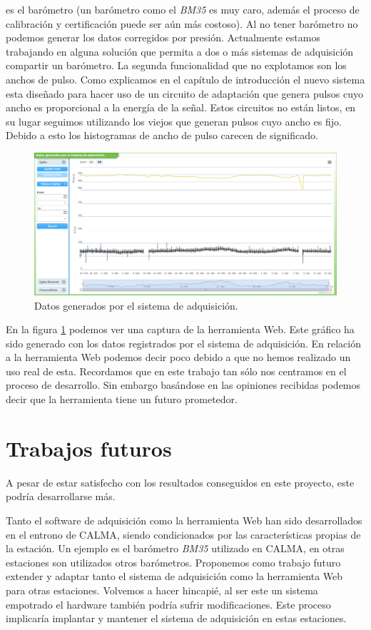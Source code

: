 	es el barómetro (un barómetro como el \emph{BM35} es muy caro, además el proceso de calibración y certificación puede ser aún más costoso). Al no
	tener barómetro no podemos generar los datos corregidos por presión. Actualmente estamos trabajando en alguna solución que permita a dos o más
	sistemas de adquisición compartir un barómetro. La segunda funcionalidad que no explotamos son los anchos de pulso. Como explicamos en el
	capítulo de introducción el nuevo sistema esta diseñado para hacer uso de un circuito de adaptación que genera pulsos cuyo ancho es
	proporcional a la energía de la señal. Estos circuitos no están listos, en su lugar seguimos utilizando los viejos que generan pulsos cuyo
	ancho es fijo. Debido a esto los histogramas de ancho de pulso carecen de significado. 
	\begin{figure}[h]
		\centering
		\includegraphics[keepaspectratio, width=1\textwidth]{./img/resultados.png}
		\caption{Datos generados por el sistema de adquisición.}   
		\label{fig:resultados}
	\end{figure}
	\par
	En la figura \ref{fig:resultados} podemos ver una captura de la herramienta Web. Este gráfico ha sido generado con los datos registrados por el
	sistema de adquisición. En relación a la herramienta Web podemos decir poco debido a que no hemos realizado un uso real de esta. Recordamos
	que en este trabajo tan sólo nos centramos en el proceso de desarrollo. Sin embargo basándose en las opiniones recibidas podemos decir que la
	herramienta tiene un futuro prometedor.

\section{Trabajos futuros}
	A pesar de estar satisfecho con los resultados conseguidos en este proyecto, este podría desarrollarse más.
	\par
	Tanto el software de adquisición como la herramienta Web han sido desarrollados en el entrono de CALMA, siendo condicionados por las
	características propias de la estación. Un ejemplo es el barómetro \emph{BM35} utilizado en CALMA, en otras estaciones son utilizados otros
	barómetros. Proponemos como trabajo futuro extender y adaptar tanto el sistema de adquisición como la herramienta Web para otras estaciones.
	Volvemos a hacer hincapié, al ser este un sistema empotrado el hardware también podría sufrir modificaciones. Este proceso implicaría
	implantar y mantener el sistema de adquisición en estas estaciones.
